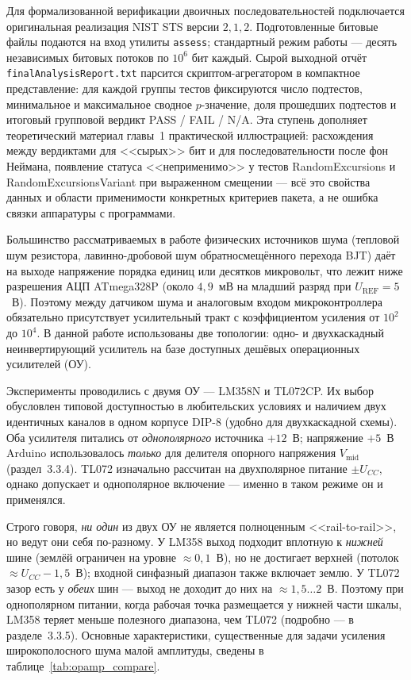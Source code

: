 
Для формализованной верификации двоичных последовательностей подключается оригинальная
реализация NIST STS версии $2{,}1{,}2$. Подготовленные битовые файлы подаются на вход
утилиты \texttt{assess}; стандартный режим работы --- десять независимых битовых потоков
по $10^6$ бит каждый. Сырой выходной отчёт \texttt{finalAnalysisReport.txt} парсится
скриптом-агрегатором в компактное представление: для каждой группы тестов фиксируются
число подтестов, минимальное и максимальное сводное $p$-значение, доля прошедших
подтестов и итоговый групповой вердикт PASS / FAIL / N/A. Эта ступень дополняет
теоретический материал главы~1 практической иллюстрацией: расхождения между
вердиктами для <<сырых>> бит и для последовательности после фон Неймана, появление
статуса <<неприменимо>> у тестов RandomExcursions и RandomExcursionsVariant при
выраженном смещении --- всё это свойства данных и области применимости конкретных
критериев пакета, а не ошибка связки аппаратуры с программами.


Большинство рассматриваемых в работе физических источников шума (тепловой шум
резистора, лавинно-дробовой шум обратносмещённого перехода BJT) даёт на выходе
напряжение порядка единиц или десятков микровольт, что лежит ниже разрешения АЦП
ATmega328P (около $4{,}9$~мВ на младший разряд при $U_\mathrm{REF}=5$~В). Поэтому
между датчиком шума и аналоговым входом микроконтроллера обязательно присутствует
усилительный тракт с коэффициентом усиления от $10^2$ до $10^4$. В данной работе
использованы две топологии: одно- и двухкаскадный неинвертирующий усилитель на базе
доступных дешёвых операционных усилителей (ОУ).


Эксперименты проводились с двумя ОУ --- LM358N и TL072CP. Их выбор обусловлен
типовой доступностью в любительских условиях и наличием двух идентичных каналов в
одном корпусе DIP-8 (удобно для двухкаскадной схемы). Оба усилителя питались от
\emph{однополярного} источника $+12$~В; напряжение $+5$~В Arduino использовалось
\emph{только} для делителя опорного напряжения $V_\mathrm{mid}$ (раздел~3.3.4).
TL072 изначально рассчитан на двухполярное питание $\pm U_{CC}$, однако допускает
и однополярное включение --- именно в таком режиме он и применялся.

Строго говоря, \emph{ни один} из двух ОУ не является полноценным
<<rail-to-rail>>, но ведут они себя по-разному. У LM358 выход подходит вплотную
к \emph{нижней} шине (землёй ограничен на уровне ${\approx}0{,}1$~В), но не
достигает верхней (потолок ${\approx}U_{CC}-1{,}5$~В); входной синфазный диапазон
также включает землю. У TL072 зазор есть у \emph{обеих} шин --- выход не доходит
до них на ${\approx}1{,}5\ldots2$~В. Поэтому при однополярном питании, когда
рабочая точка размещается у нижней части шкалы, LM358 теряет меньше полезного
диапазона, чем TL072 (подробно --- в разделе~3.3.5). Основные характеристики,
существенные для задачи усиления широкополосного шума малой амплитуды, сведены в
таблице~\ref{tab:opamp_compare}.

